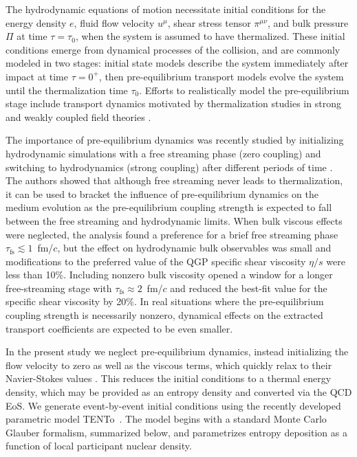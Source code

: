 \documentclass[aps,prc,reprint,amsmath,nofootinbib,noeprint]{revtex4-1}
\newcommand{\trento}{T\raisebox{-0.5ex}{R}ENTo}
\begin{document}
The hydrodynamic equations of motion necessitate initial conditions for the energy density $e$, fluid flow velocity $u^\mu$, shear stress tensor $\pi^{\mu\nu}$, and bulk pressure $\Pi$ at time $\tau = \tau_0$, when the system is assumed to have thermalized.
These initial conditions emerge from dynamical processes of the collision, and are commonly modeled in two stages: initial state models describe the system immediately after impact at time $\tau=0^+$, then pre-equilibrium transport models evolve the system until the thermalization time $\tau_0$.
Efforts to realistically model the pre-equilibrium stage include transport dynamics \cite{Schenke:2012wb, Schenke:2012fw, vanderSchee:2013pia, vanderSchee:2015rta, Chesler:2015fpa} motivated by thermalization studies in strong and weakly coupled field theories \cite{Romatschke:2006nk, Krasnitz:2002ng, Berges:2013eia, Arnold:2004ti, Kurkela:2011ti, Heller:2012km, vanderSchee:2013pia, Rebhan:2004ur, Heller:2011ju, Janik:2006gp}.

The importance of pre-equilibrium dynamics was recently studied by initializing hydrodynamic simulations with a free streaming phase (zero coupling) and switching to hydrodynamics (strong coupling) after different periods of time \cite{Liu:2015nwa, Heinz:2015arc}.
The authors showed that although free streaming never leads to thermalization, it can be used to bracket the influence of pre-equilibrium dynamics on the medium evolution as the pre-equilibrium coupling strength is expected to fall between the free streaming and hydrodynamic limits.
When bulk viscous effects were neglected, the analysis found a preference for a brief free streaming phase $\tau_\text{fs} \lesssim 1$~fm/$c$, but the effect on hydrodynamic bulk observables was small and modifications to the preferred value of the QGP specific shear viscosity $\eta/s$ were less than 10\%.
Including nonzero bulk viscosity opened a window for a longer free-streaming stage with $\tau_\mathrm{fs} \approx 2$~fm/$c$ and reduced the best-fit value for the specific shear viscosity by 20\%.
In real situations where the pre-equilibrium coupling strength is necessarily nonzero, dynamical effects on the extracted transport coefficients are expected to be even smaller.

In the present study we neglect pre-equilibrium dynamics, instead initializing the flow velocity to zero as well as the viscous terms, which quickly relax to their Navier-Stokes values \cite{Song:2009rh}.
This reduces the initial conditions to a thermal energy density, which may be provided as an entropy density and converted via the QCD EoS.
We generate event-by-event initial conditions using the recently developed parametric model \trento\ \cite{Moreland:2014oya}.
The model begins with a standard Monte Carlo Glauber formalism, summarized below, and parametrizes entropy deposition as a function of local participant nuclear density.
\end{document}
